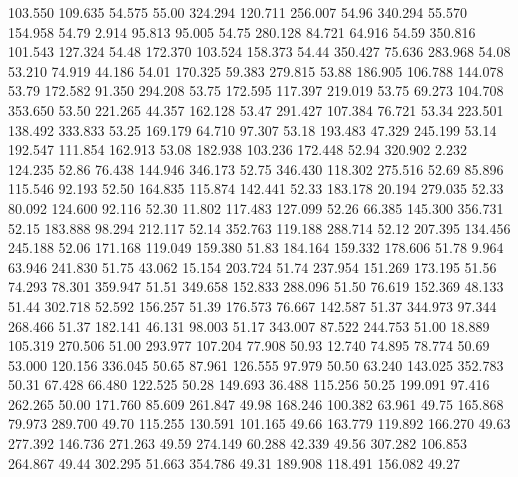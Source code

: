  103.550  109.635   54.575        55.00
 324.294  120.711  256.007        54.96
 340.294   55.570  154.958        54.79
   2.914   95.813   95.005        54.75
 280.128   84.721   64.916        54.59
 350.816  101.543  127.324        54.48
 172.370  103.524  158.373        54.44
 350.427   75.636  283.968        54.08
  53.210   74.919   44.186        54.01
 170.325   59.383  279.815        53.88
 186.905  106.788  144.078        53.79
 172.582   91.350  294.208        53.75
 172.595  117.397  219.019        53.75
  69.273  104.708  353.650        53.50
 221.265   44.357  162.128        53.47
 291.427  107.384   76.721        53.34
 223.501  138.492  333.833        53.25
 169.179   64.710   97.307        53.18
 193.483   47.329  245.199        53.14
 192.547  111.854  162.913        53.08
 182.938  103.236  172.448        52.94
 320.902    2.232  124.235        52.86
  76.438  144.946  346.173        52.75
 346.430  118.302  275.516        52.69
  85.896  115.546   92.193        52.50
 164.835  115.874  142.441        52.33
 183.178   20.194  279.035        52.33
  80.092  124.600   92.116        52.30
  11.802  117.483  127.099        52.26
  66.385  145.300  356.731        52.15
 183.888   98.294  212.117        52.14
 352.763  119.188  288.714        52.12
 207.395  134.456  245.188        52.06
 171.168  119.049  159.380        51.83
 184.164  159.332  178.606        51.78
   9.964   63.946  241.830        51.75
  43.062   15.154  203.724        51.74
 237.954  151.269  173.195        51.56
  74.293   78.301  359.947        51.51
 349.658  152.833  288.096        51.50
  76.619  152.369   48.133        51.44
 302.718   52.592  156.257        51.39
 176.573   76.667  142.587        51.37
 344.973   97.344  268.466        51.37
 182.141   46.131   98.003        51.17
 343.007   87.522  244.753        51.00
  18.889  105.319  270.506        51.00
 293.977  107.204   77.908        50.93
  12.740   74.895   78.774        50.69
  53.000  120.156  336.045        50.65
  87.961  126.555   97.979        50.50
  63.240  143.025  352.783        50.31
  67.428   66.480  122.525        50.28
 149.693   36.488  115.256        50.25
 199.091   97.416  262.265        50.00
 171.760   85.609  261.847        49.98
 168.246  100.382   63.961        49.75
 165.868   79.973  289.700        49.70
 115.255  130.591  101.165        49.66
 163.779  119.892  166.270        49.63
 277.392  146.736  271.263        49.59
 274.149   60.288   42.339        49.56
 307.282  106.853  264.867        49.44
 302.295   51.663  354.786        49.31
 189.908  118.491  156.082        49.27
